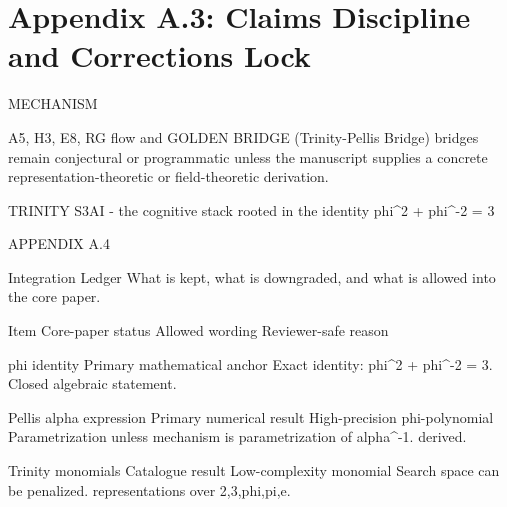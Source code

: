 
\section{Appendix A.3: Claims Discipline and Corrections Lock}

MECHANISM

  A5, H3, E8, RG flow and GOLDEN BRIDGE (Trinity-Pellis Bridge) bridges remain conjectural or programmatic unless the manuscript
  supplies a concrete representation-theoretic or field-theoretic derivation.

                           TRINITY S3AI - the cognitive stack rooted in the identity phi^2 + phi^-2 = 3

                                                          APPENDIX A.4

                                     Integration Ledger
                What is kept, what is downgraded, and what is allowed into the core paper.

          Item                  Core-paper status                      Allowed wording                        Reviewer-safe reason

 phi identity              Primary mathematical anchor      Exact identity: phi^2 + phi^-2 = 3.       Closed algebraic statement.

 Pellis alpha expression   Primary numerical result         High-precision phi-polynomial             Parametrization unless mechanism is
                                                            parametrization of alpha^-1.              derived.

 Trinity monomials         Catalogue result                 Low-complexity monomial                   Search space can be penalized.
                                                            representations over {2,3,phi,pi,e}.